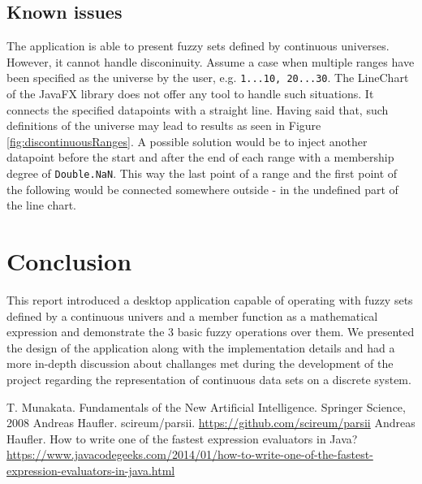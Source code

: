 \documentclass[12pt,a4paper,titlepage,final]{article}
\begin{document}
\subsection{Known issues}
The application is able to present fuzzy sets defined by continuous universes. However, it cannot handle disconinuity. Assume a case when multiple ranges have been specified as the universe by the user, e.g. \verb|1...10, 20...30|. The LineChart of the JavaFX library does not offer any tool to handle such situations. It connects the specified datapoints with a straight line. Having said that, such definitions of the universe may lead to results as seen in Figure \ref{fig:discontinuousRanges}. A possible solution would be to inject another datapoint before the start and after the end of each range with a membership degree of \verb|Double.NaN|. This way the last point of a range and the first point of the following would be connected somewhere outside - in the undefined part of the line chart.

\section{Conclusion} \label{conclusion}
This report introduced a desktop application capable of operating with fuzzy sets defined by a continuous univers and a member function as a mathematical expression and demonstrate the 3 basic fuzzy operations over them. We presented the design of the application along with the implementation details and had a more in-depth discussion about challanges met during the development of the project regarding the representation of continuous data sets on a discrete system.

\newpage
\begin{thebibliography}{1}
T. Munakata. Fundamentals of the New Artificial Intelligence. Springer Science, 2008
Andreas Haufler. scireum/parsii. \url{https://github.com/scireum/parsii}
Andreas Haufler. How to write one of the fastest expression evaluators in Java? \url{https://www.javacodegeeks.com/2014/01/how-to-write-one-of-the-fastest-expression-evaluators-in-java.html}
\end{thebibliography}
\end{document}
